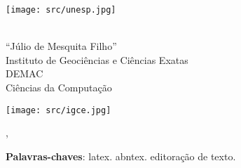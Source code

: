 \documentclass[12pt, openright, oneside, a4paper, chapter=TITLE, section=TITLE, subsection=TITLE, subsubsection=TITLE, brazil]{abntex2}
\begin{document}
\frenchspacing


\begin{capa}
    \thispagestyle{empty}
    \centering
    \vspace*{1cm}

    \begin{minipage}{0.2\linewidth}
        \centering
        \texttt{[image: src/unesp.jpg]}
    \end{minipage}%
    \hfill
    \begin{minipage}{0.6\linewidth}
        \centering
        {\large \imprimirinstituicao} \\
        {\large ``J\'ulio de Mesquita Filho''} \\
        {\large Instituto de Geociências e Ciências Exatas} \\
        {\large DEMAC} \\
        {\large Ciências da Computação}
    \end{minipage}%
    \hfill
    \begin{minipage}{0.2\linewidth}
        \centering
        \texttt{[image: src/igce.jpg]}
    \end{minipage}

    \vspace*{1cm}
    {\ABNTEXchapterfont\large\imprimirautor}
    \vspace*{\fill}

    {\ABNTEXchapterfont\bfseries \large \imprimirtitulo}
    \vspace*{\fill}

    {\large\imprimirtipotrabalho}
    \vspace*{\fill}

    {\large\imprimirlocal}, {\large\imprimirdata}
    \vspace*{1cm}
\end{capa}

\imprimirfolhaderosto*

\setlength{\absparsep}{18pt} %
\begin{resumo}
 \lipsum[1-4]

 \textbf{Palavras-chaves}: latex. abntex. editoração de texto.
\end{resumo}
\end{document}

